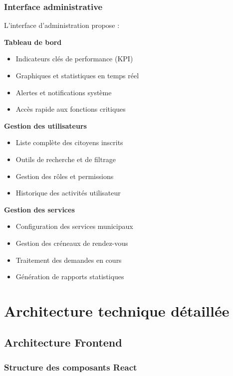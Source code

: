 \subsubsection{Interface administrative}

L'interface d'administration propose :

\textbf{Tableau de bord}
\begin{itemize}
\item Indicateurs clés de performance (KPI)
\item Graphiques et statistiques en temps réel
\item Alertes et notifications système
\item Accès rapide aux fonctions critiques
\end{itemize}

\textbf{Gestion des utilisateurs}
\begin{itemize}
\item Liste complète des citoyens inscrits
\item Outils de recherche et de filtrage
\item Gestion des rôles et permissions
\item Historique des activités utilisateur
\end{itemize}

\textbf{Gestion des services}
\begin{itemize}
\item Configuration des services municipaux
\item Gestion des créneaux de rendez-vous
\item Traitement des demandes en cours
\item Génération de rapports statistiques
\end{itemize}

\section{Architecture technique détaillée}

\subsection{Architecture Frontend}

\subsubsection{Structure des composants React}

